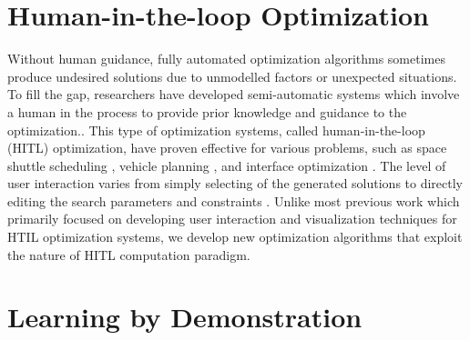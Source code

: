 \section{Human-in-the-loop Optimization}

Without human guidance, fully automated optimization algorithms
sometimes produce undesired solutions due to unmodelled factors or
unexpected situations. To fill the gap, researchers have developed
semi-automatic systems which involve a human in the process to provide
prior knowledge and guidance to the
optimization.\cite{Scott:2002:IHC}. 
This type of optimization systems, called human-in-the-loop (HITL)
optimization, have proven effective for various problems, such as
space shuttle scheduling \cite{Chien:1999:APS}, vehicle planning
\cite{Waters:1984:IVR}, and interface optimization
\cite{Quiroz:2007:IEX}.  The level of user interaction
varies from simply selecting of the generated solutions
\cite{Sims:1991:AEC} to directly editing the search parameters and
constraints \cite{Sreevalsan-Nair:2007:HGE}. Unlike
most previous work which primarily focused on developing user
interaction and visualization techniques for HTIL optimization
systems, we develop new optimization algorithms that exploit the nature of
HITL computation paradigm.


\section{Learning by Demonstration}


